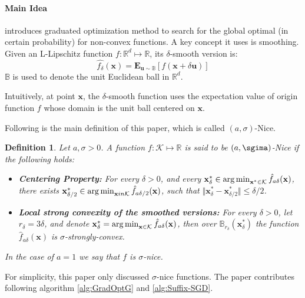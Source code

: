 \paragraph{Main Idea}
\cite{Hazan2015} introduces  graduated optimization method to search for the global optimal (in certain probability) for non-convex functions. A key concept it uses is smoothing. Given an L-Lipschitz function $f: \mathbb{R}^d \mapsto \mathbb{R}$, its $\delta$-smooth version is:
$$
\hat{f_\delta}(\mathbf{x}) = \mathbf{E}_{\mathbf{u}\sim\mathbb{B}}[f(\mathbf{x}+\delta\mathbf{u})]
$$
$\mathbb{B}$ is used to denote the unit Euclidean ball in $\mathbb{R}^d$. 

Intuitively, at point $\mathbf{x}$, the $\delta$-smooth function uses the expectation value of origin function $f$ whose domain is the unit ball centered on $\mathbf{x}$.

Following is the main definition of this paper, which is called $(a, \sigma)$-Nice.
\newtheorem{sigma-Nice}{Definition}
\begin{sigma-Nice}
Let $a, \sigma > 0$. A function $f: \mathcal{K} \mapsto \mathbb{R}$ is said to be $(a, \sgima)$-Nice if the following holds:

\begin{itemize}
    \item \textbf{Centering Property:} For every $\delta > 0$, and every $\mathbf{x}^*_\delta \in \operatorname*{arg\,min}_{\mathbf{x}^* \in \mathcal{K}} \hat{f}_{a\delta}(\mathbf{x})$, there exists $\mathbf{x}^*_{\delta/2} \in \operatorname*{arg\,min}_{\mathbf{x} in \mathcal{K}} \hat{f}_{a\delta/2}(\mathbf{x})$, such that $\Vert\mathbf{x}^*_{\delta} - \mathbf{x}^*_{\delta/2}\Vert \leq \delta/2$.
    \item \textbf{Local strong convexity of the smoothed versions:} For every $\delta > 0 $, let $r_\delta = 3\delta$, and denote $\mathbf{x}^*_{\delta} = \operatorname*{arg\,min}_{\mathbf{x} \in \mathcal{K}} \hat{f}_{a\delta}(\mathbf{x})$, then over $\mathbb{B}_{r_\delta}(\mathbf{x}^*_{\delta})$ the function $\hat{f}_{a\delta}(\mathbf{x})$ is $\sigma$-strongly-convex.
\end{itemize}
In the case of $a=1$ we say that $f$ is $\sigma$-nice.
\end{sigma-Nice}

For simplicity, this paper only discussed $\sigma$-nice functions. The paper contributes following algorithm \ref{alg:GradOptG} and \ref{alg:Suffix-SGD}.

